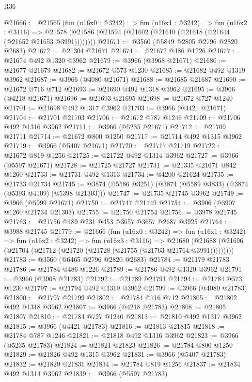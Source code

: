 \begin{lexlean}{R36}
\begin{coremodule}
@21666 := @21565
    (fun (u16x0 : @3242) =>
    fun (u16x1 : @3242) =>
    fun (u16x2 : @3116) =>
    @21578 (@21586 (@21594 (@21602 (@21610 (@21618 (@21644 (@21652 @21653 @3991))))))))
@21671 := @3560 (@5849 @2805 @2796 @2820 @2683)
@21672 := @21304 @21671
@21674 := @21672 @486 @1226
@21677 := @21674 @492 @1320 @3962
@21679 := @3966 (@3968 @21671)
@21680 := @21677 @21679
@21682 := @21672 @573 @1230
@21685 := @21682 @492 @1319 @3962
@21687 := @3966 (@4080 @21671)
@21688 := @21685 @21687
@21690 := @21672 @716 @712
@21693 := @21690 @492 @1318 @3962
@21695 := @3966 (@4218 @21671)
@21696 := @21693 @21695
@21698 := @21672 @727 @1240
@21701 := @21698 @492 @1317 @3962
@21703 := @3966 (@4421 @21671)
@21704 := @21701 @21703
@21706 := @21672 @787 @1246
@21709 := @21706 @492 @1316 @3962
@21711 := @3966 (@5235 @21671)
@21712 := @21709 @21711
@21714 := @21672 @800 @1250
@21717 := @21714 @492 @1315 @3962
@21719 := @3966 (@5407 @21671)
@21720 := @21717 @21719
@21722 := @21672 @819 @1256
@21725 := @21722 @492 @1314 @3962
@21727 := @3966 (@5597 @21671)
@21728 := @21725 @21727
@21731 := @21335 @21671 @842 @1260
@21733 := @21731 @492 @1313
@21734 := @4200 @21624
@21735 := @21733 @21734
@21745 := @3874 (@5586 @3251) (@3874 (@5589 @3833) (@3874 (@5393 @4109) (@5398 @21303)))
@21747 := @21735 @21745 @3962
@21749 := @3966 (@5999 @21671)
@21750 := @21747 @21749
@21754 := @3906 (@3907 @1260 @21734 @21303)
@21755 := @21750 @21754
@21756 := @3978 @21745
@21763 := @21756 @489 @231 @453 @3657 @3657 @2687 @3925
@21764 := @3988 @21745
@21779 := @21666
    (fun (u16x0 : @3242) =>
    fun (u16x1 : @3242) =>
    fun (u16x2 : @3242) =>
    fun (u16x3 : @3116) =>
    @21680 (@21688 (@21696 (@21704 (@21712 (@21720 (@21728 (@21755 (@21763 @21764 @3991)))))))))
@21783 := @3560 (@6465 @2796 @2820 @2683)
@21784 := @21179 @21783
@21786 := @21784 @486 @1226
@21789 := @21786 @492 @1320 @3962
@21791 := @3966 (@3968 @21783)
@21792 := @21789 @21791
@21794 := @21784 @573 @1230
@21797 := @21794 @492 @1319 @3962
@21799 := @3966 (@4080 @21783)
@21800 := @21797 @21799
@21802 := @21784 @716 @712
@21805 := @21802 @492 @1318 @3962
@21807 := @3966 (@4218 @21783)
@21808 := @21805 @21807
@21810 := @21784 @727 @1240
@21813 := @21810 @492 @1317 @3962
@21815 := @3966 (@4421 @21783)
@21816 := @21813 @21815
@21818 := @21784 @787 @1246
@21821 := @21818 @492 @1316 @3962
@21823 := @3966 (@5235 @21783)
@21824 := @21821 @21823
@21826 := @21784 @800 @1250
@21829 := @21826 @492 @1315 @3962
@21831 := @3966 (@5407 @21783)
@21832 := @21829 @21831
@21834 := @21784 @819 @1256
@21837 := @21834 @492 @1314 @3962
@21839 := @3966 (@5597 @21783)

\end{coremodule}
\end{lexlean}

